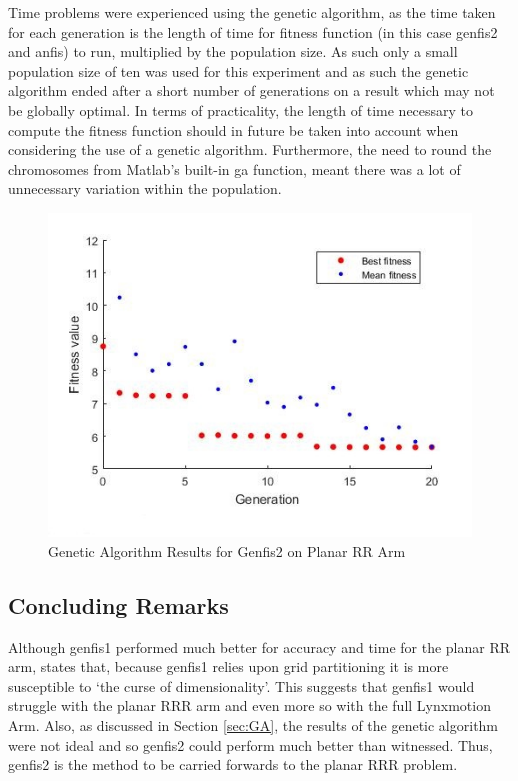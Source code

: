 \documentclass[11.5pt, twoside, a4paper]{article}
\begin{document}
Time problems were experienced using the genetic algorithm, as the time taken for each generation is the length of time for fitness function (in this case genfis2 and anfis) to run, multiplied by the population size. As such only a small population size of ten was used for this experiment and as such the genetic algorithm ended after a short number of generations on a result which may not be globally optimal. In terms of practicality, the length of time necessary to compute the fitness function should in future be taken into account when considering the use of a genetic algorithm. Furthermore, the need to round the chromosomes from Matlab's built-in ga function, meant there was a lot of unnecessary variation within the population.

\begin{figure}
\begin{center}
\includegraphics[width=\linewidth]{GAResults.jpg}
\caption{Genetic Algorithm Results for Genfis2 on Planar RR Arm\label{fig:GA}}
\end{center}
\end{figure}

\subsection{Concluding Remarks}
Although genfis1 performed much better for accuracy and time for the planar RR arm, \cite{faq} states that, because genfis1 relies upon grid partitioning it is more susceptible to `the curse of dimensionality'. This suggests that genfis1 would struggle with the planar RRR arm and even more so with the full Lynxmotion Arm. Also, as discussed in Section \ref{sec:GA}, the results of the genetic algorithm were not ideal and so genfis2 could perform much better than witnessed. Thus, genfis2 is the method to be carried forwards to the planar RRR problem. 
\end{document}
